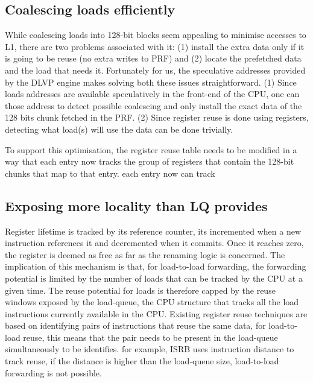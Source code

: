 \documentclass{sig-alternate}
\begin{document}
\subsection{Coalescing loads efficiently}
While coalescing loads into 128-bit blocks seem appealing to minimise accesses to L1, there are two problems associated with it: (1) install the extra data only if it is going to be reuse (no extra writes to PRF) and (2) locate the prefetched data and the load that needs it. Fortunately for us, the speculative addresses provided by the DLVP engine makes solving both these issues straightforward. (1) Since loads addresses are available speculatively in the front-end of the CPU, one can those address to detect possible coalescing and only install the exact data of the 128 bits chunk fetched in the PRF. (2) Since register reuse is done using registers, detecting what load(s) will use the data can be done trivially.

To support this optimisation, the register reuse table needs to be modified in a way that each entry now tracks the group of registers that contain the 128-bit chunks that map to that entry. each entry now can track  




\subsection{Exposing more locality than LQ provides}
Register lifetime is tracked by its reference counter, its incremented when a new instruction references it and decremented when it commits. Once it reaches zero, the register is deemed as free as far as the renaming logic is concerned. The implication of this mechanism is that, for load-to-load forwarding, the forwarding potential is limited by the number of loads that can be tracked by the CPU at a given time. The reuse potential for loads is therefore capped by the reuse windows exposed by the load-queue, the CPU structure that tracks all the load instructions currently available in the CPU. Existing register reuse techniques are based on identifying pairs of instructions that reuse the same data, for load-to-load reuse, this means that the pair needs to be present in the load-queue simultaneously to be identifies. for example, ISRB uses instruction distance to track reuse, if the distance is higher than the load-queue size, load-to-load forwarding is not possible. 
\end{document}
